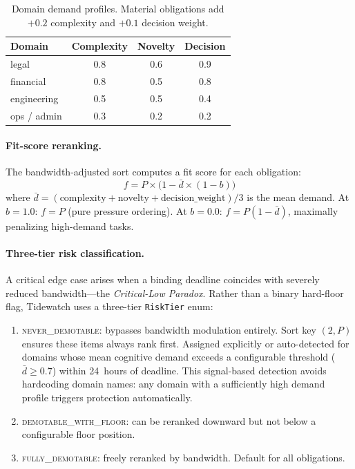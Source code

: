 \documentclass[11pt]{article}
\begin{document}
\begin{table}[t]
\centering
\caption{Domain demand profiles.  Material obligations add $+0.2$
complexity and $+0.1$ decision weight.}
\label{tab:demand}
\begin{tabular}{@{}lccc@{}}
\toprule
\textbf{Domain} & \textbf{Complexity} & \textbf{Novelty} &
  \textbf{Decision} \\
\midrule
legal      & 0.8 & 0.6 & 0.9 \\
financial  & 0.8 & 0.5 & 0.8 \\
engineering & 0.5 & 0.5 & 0.4 \\
ops / admin & 0.3 & 0.2 & 0.2 \\
\bottomrule
\end{tabular}
\end{table}

\paragraph{Fit-score reranking.}
The bandwidth-adjusted sort computes a fit score for each obligation:
\begin{equation}
\label{eq:fit}
f = P \times \bigl(1 - \bar{d} \times (1 - b)\bigr)
\end{equation}
where $\bar{d} = (\text{complexity} + \text{novelty} +
\text{decision\_weight}) / 3$ is the mean demand.
At $b = 1.0$: $f = P$ (pure pressure ordering).
At $b = 0.0$: $f = P(1 - \bar{d})$, maximally penalizing
high-demand tasks.

\paragraph{Three-tier risk classification.}
A critical edge case arises when a binding deadline coincides with
severely reduced bandwidth---the \emph{Critical-Low Paradox}.
Rather than a binary hard-floor flag, Tidewatch uses a three-tier
\texttt{RiskTier} enum:

\begin{enumerate}[nosep]
  \item[\textbf{0}] \textsc{never\_demotable}: bypasses bandwidth
    modulation entirely.  Sort key $(2, P)$ ensures these items
    always rank first.  Assigned explicitly or auto-detected for
    domains whose mean cognitive demand exceeds a configurable
    threshold ($\bar{d} \geq 0.7$) within 24~hours of deadline.
    This signal-based detection avoids hardcoding domain names:
    any domain with a sufficiently high demand profile triggers
    protection automatically.
  \item[\textbf{1}] \textsc{demotable\_with\_floor}: can be reranked
    downward but not below a configurable floor position.
  \item[\textbf{2}] \textsc{fully\_demotable}: freely reranked by
    bandwidth.  Default for all obligations.
\end{enumerate}
\end{document}
